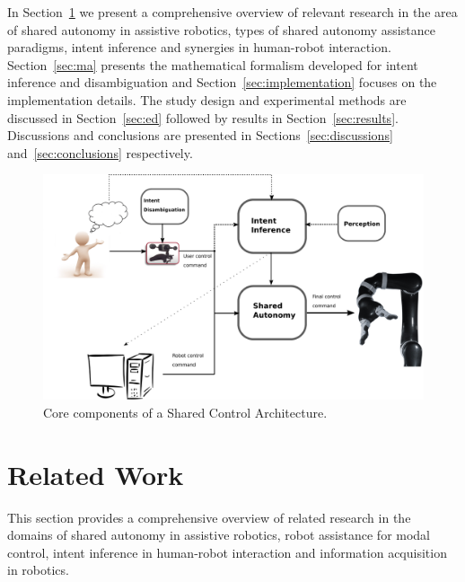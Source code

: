 In Section~\ref{sec:related-work} we present a comprehensive overview of relevant research in the area of shared autonomy in assistive robotics, types of shared autonomy assistance paradigms, intent inference and synergies in human-robot interaction. Section~\ref{sec:ma} presents the mathematical formalism developed for intent inference and disambiguation and Section~\ref{sec:implementation} focuses on the implementation details. The study design and experimental methods are discussed in Section~\ref{sec:ed} followed by results in Section~\ref{sec:results}. Discussions and conclusions are presented in Sections~\ref{sec:discussions} and~\ref{sec:conclusions} respectively. 


%
\begin{figure}[t!]
	\includegraphics[keepaspectratio, width = \textwidth]{./figures/Fig2_SharedControl.eps}
	\caption{Core components of a Shared Control Architecture. }
	\label{fig:shared_control}
\end{figure}

\section{Related Work}\label{sec:related-work}
This section provides a comprehensive overview of related research in the domains of shared autonomy in assistive robotics, robot assistance for modal control, intent inference in human-robot interaction and information acquisition in robotics. 

